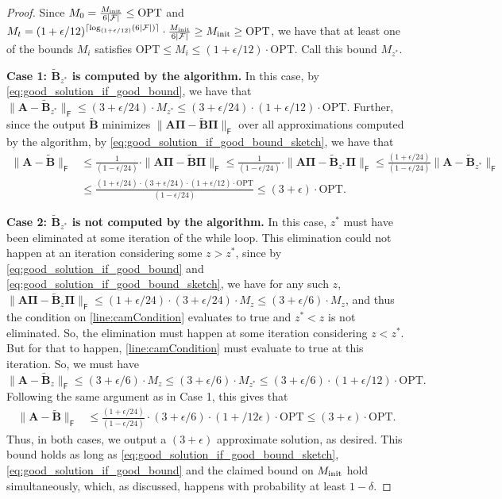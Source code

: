 \documentclass{article}[11pt]
\theoremstyle{definition}
\newcommand{\bv}[1]{\boldsymbol{\mathbf{#1}}}
\newcommand{\Fro}{\mathsf{F}}
\newcommand{\F}{\mathcal{F}}
\newcommand{\OPT}{\mathrm{OPT}}
\begin{document}
\begin{proof}
    Since $M_0 = \frac{M_{\rm init}}{6|\F|} \le \OPT$ and $M_t = (1+\epsilon/12)^{\lceil\log_{(1+\epsilon/12)}(6|\mathcal F|) \rceil} \cdot \frac{M_{\rm init}}{6|\F|} \ge M_{\rm init} \ge  \OPT$, we have that at least one of the bounds $M_i$ satisfies $\OPT \le M_i \le (1+\epsilon/12) \cdot \OPT$. Call this bound $M_{z^*}$. 
    
    \smallskip
    
    \noindent\textbf{Case 1: $\bv{\tilde B}_{z^*}$ is computed by the algorithm.} In this case, by \eqref{eq:good_solution_if_good_bound}, we have that $\|\bv{A} - \bv{\tilde B}_{z^*}\|_\Fro \le (3+\epsilon/24) \cdot M_{z^*} \le (3+\epsilon/24) \cdot (1+\epsilon/12) \cdot \OPT$. Further, since the output $\bv{\tilde B}$ minimizes $\|\bv A \bv \Pi - \bv{\tilde B} \bv \Pi\|_\Fro$ over all approximations computed by the algorithm, by \eqref{eq:good_solution_if_good_bound_sketch}, we have that
    \begin{align*}
        \|\bv A - \bv{\tilde B}\|_\Fro &\le \frac{1}{(1-\epsilon/24)} \cdot \|\bv A \bv \Pi - \bv{\tilde B} \bv \Pi\|_\Fro \le \frac{1}{(1-\epsilon/24)}\cdot \|\bv A \bv \Pi - \bv{\tilde B}_{z^*} \bv \Pi\|_\Fro \le \frac{(1+\epsilon/24)}{(1-\epsilon/24)} \|\bv A - \bv {\tilde B}_{z^*}\|_\Fro\\ &\le \frac{(1+\epsilon/24) \cdot (3+\epsilon/24)\cdot (1+\epsilon/12) \cdot \OPT}{(1-\epsilon/24)} \le (3+\epsilon) \cdot \OPT.
    \end{align*}
    \smallskip

    \noindent\textbf{Case 2: $\bv{\tilde B}_{z^*}$ is not computed by the algorithm.} In this case, $z^*$ must have been eliminated at some iteration of the while loop. This elimination could not happen at an iteration considering some $z > z^*$, since by \eqref{eq:good_solution_if_good_bound} and \eqref{eq:good_solution_if_good_bound_sketch}, we have for any such $z$, $\|\bv{A}\bv{\Pi} - \bv{\tilde B}_z \bv \Pi\|_\Fro \le (1+\epsilon/24) \cdot (3+\epsilon/24) \cdot M_z \le (3+\epsilon/6) \cdot M_z$, and thus the condition on \cref{line:camCondition} evaluates to true and $z^* < z$ is not eliminated. So, the elimination must happen at some iteration considering $z < z^*$. But for that to happen, \cref{line:camCondition} must evaluate to true at this iteration. So, we must have \[\|\bv A -\bv{\tilde B}_z\|_\Fro \le (3+\epsilon/6) \cdot M_z \le (3+\epsilon/6) \cdot M_{z^*} \le (3+\epsilon/6) \cdot (1+\epsilon/12) \cdot \OPT.\] Following the same argument as in Case 1, this gives that 
    \begin{align*}
        \|\bv A - \bv{\tilde B}\|_\Fro &\le \frac{(1+\epsilon/24)}{(1-\epsilon/24)} \cdot (3+\epsilon/6) \cdot (1+/12\epsilon) \cdot \OPT \le (3+\epsilon) \cdot \OPT.
    \end{align*}
     Thus, in both cases, we output a $(3+\epsilon)$ approximate solution, as desired. This bound holds as long as \eqref{eq:good_solution_if_good_bound_sketch},\eqref{eq:good_solution_if_good_bound} and the claimed bound on $M_{\rm init}$ hold simultaneously, which, as discussed, happens with probability at least $1-\delta$.


\end{proof}
\end{document}
